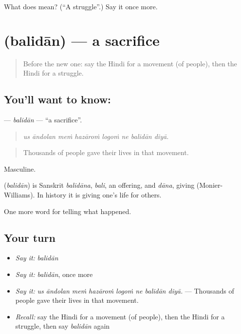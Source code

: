 \begin{tcolorbox}[breakable,colback=teal!4,colframe=teal!35!black,title={Before you move on}]
What does  mean? (\textquotedblleft{}A struggle\textquotedblright{}.) Say it once more.
\end{tcolorbox}
\section[\texorpdfstring{\hi{बलिदान} (balidān)}{बलिदान (balidān)}]{ (balidān) — a sacrifice}

\label{lesson:HI-C325-balidan}



\begin{quote}
Before the new one: say the Hindi for a movement (of people), then the Hindi for a struggle.
\end{quote}

\subsection*{You'll want to know: }
\textbf{} — \emph{balidān} — \textquotedblleft{}a sacrifice\textquotedblright{}.

\begin{quote}
       
\end{quote}

\begin{quote}
\emph{us āndolan meṁ hazāroṁ logoṁ ne balidān diyā.}
\end{quote}

\begin{quote}
Thousands of people gave their lives in that movement.
\end{quote}

Masculine.

\begin{cousinweb}
\textbf{} (\emph{balidān}) is Sanskrit \emph{balidāna}, \emph{bali}, an offering, and \emph{dāna}, giving (Monier-Williams). In history it is giving one's life for others.
\end{cousinweb}

\begin{grammarlens}[title={What you've built}]
One more word for telling what happened.
\end{grammarlens}

\subsection*{Your turn}
\begin{itemize}
\raggedright
  \item \emph{Say it:} \emph{balidān}
  \item \emph{Say it:} \emph{balidān}, once more
  \item \emph{Say it:} \emph{us āndolan meṁ hazāroṁ logoṁ ne balidān diyā.} — Thousands of people gave their lives in that movement.
  \item \emph{Recall:} say the Hindi for a movement (of people), then the Hindi for a struggle, then say \emph{balidān} again
\end{itemize}

